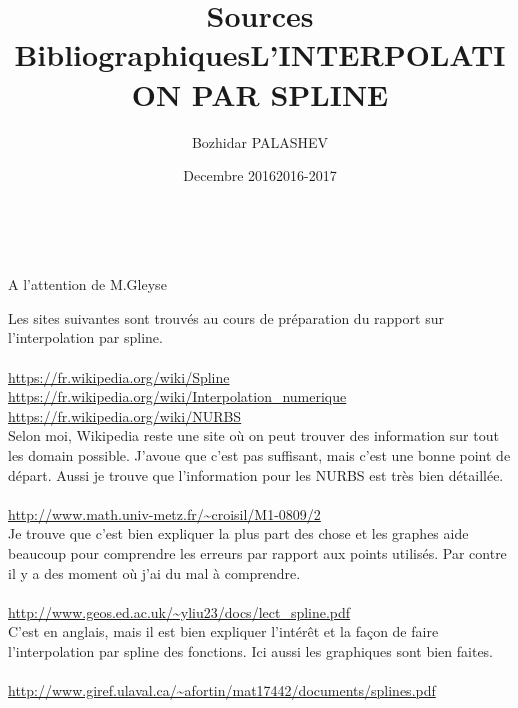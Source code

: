\documentclass{article}
\title{Sources Bibliographiques}
\author{Bozhidar PALASHEV}
\date{Decembre 2016}
\begin{document}
\maketitle

\vspace{10\baselineskip}
\begin{center}
\makeatother
\title{L'INTERPOLATION PAR SPLINE}\\
\end{center}

\vspace{12\baselineskip}
\begin{center}
A l'attention de M.Gleyse\\
\date{2016-2017}
\end{center}

\newpage
\begingroup\raggedleft
Les sites suivantes sont trouv\'es au cours de pr\'eparation du rapport sur l'interpolation par spline.
\endgroup
\\
\\
{\color{blue}
\url{https://fr.wikipedia.org/wiki/Spline}}
\\
{\color{blue}
\url{https://fr.wikipedia.org/wiki/Interpolation_numerique}}
\\ 
{\color{blue}
\url{https://fr.wikipedia.org/wiki/NURBS}}
\\ 
Selon moi, Wikipedia reste une site o\`u on peut trouver des information sur tout les domain possible.
J'avoue que c'est pas suffisant, mais c'est une bonne point de d\'epart. Aussi je trouve que l'information pour les NURBS est tr\`es bien d\'etaill\'ee. 
\\\\
{\color{blue}
\url{http://www.math.univ-metz.fr/~croisil/M1-0809/2}}\\
Je trouve que c'est bien expliquer la plus part des chose et les graphes aide beaucoup pour comprendre les erreurs par rapport aux points utilis\'es. Par contre il y a des moment o\`u j'ai du mal \`a comprendre.\\
\\
{\color{blue}
\url{http://www.geos.ed.ac.uk/~yliu23/docs/lect_spline.pdf}}\\
C'est en anglais, mais il est bien expliquer l'int\'er\^et et la fa\c con de faire l'interpolation par spline des fonctions. Ici aussi les graphiques sont bien faites.\\
\\ 
{\color{blue}
\url{http://www.giref.ulaval.ca/~afortin/mat17442/documents/splines.pdf}}\\
\end{document}
